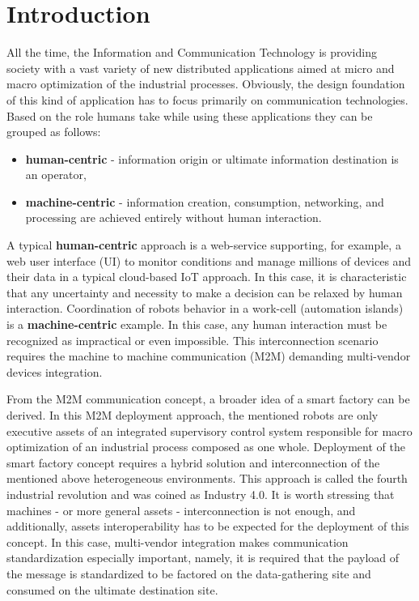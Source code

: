 \documentclass[runningheads]{llncs}
\begin{document}
\section{Introduction}\label{introduction}

All the time, the Information and Communication Technology is providing society with a vast variety of new distributed applications aimed at micro and macro optimization of the industrial processes. Obviously, the design foundation of this kind of application has to focus primarily on communication technologies. Based on the role humans take while using these applications they can be grouped as follows:

\begin{itemize}
      \item \textbf{human-centric} - information origin or ultimate information destination is an operator,
      \item \textbf{machine-centric} - information creation, consumption, networking, and processing are achieved entirely without human interaction.
\end{itemize}

A typical \textbf{human-centric} approach is a web-service supporting, for example, a web user interface (UI) to monitor conditions and manage millions of devices and their data in a typical cloud-based IoT approach. In this case, it is characteristic that any uncertainty and necessity to make a decision can be relaxed by human interaction. Coordination of robots behavior in a work-cell (automation islands) is a \textbf{machine-centric} example. In this case, any human interaction must be recognized as impractical or even impossible. This interconnection scenario requires the machine to machine communication (M2M) demanding multi-vendor devices integration.

From the M2M communication concept, a broader idea of a smart factory can be derived. In this M2M  deployment approach, the mentioned robots are only executive assets of an integrated supervisory control system responsible for macro optimization of an industrial process composed as one whole. Deployment of the smart factory concept requires a hybrid solution and interconnection of the mentioned above heterogeneous environments. This approach is called the fourth industrial revolution and was coined as Industry 4.0. It is worth stressing that machines - or more general assets - interconnection is not enough, and additionally, assets interoperability has to be expected for the deployment of this concept. In this case, multi-vendor integration makes communication standardization especially important, namely, it is required that the payload of the message is standardized to be factored on the data-gathering site and consumed on the ultimate destination site.
\end{document}
